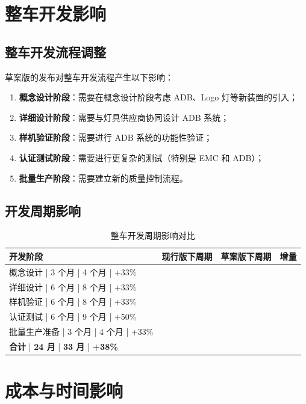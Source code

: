 \section{整车开发影响}

\subsection{整车开发流程调整}

草案版的发布对整车开发流程产生以下影响：

\begin{enumerate}[leftmargin=2em]
    \item \textbf{概念设计阶段}：需要在概念设计阶段考虑 ADB、Logo 灯等新装置的引入；
    \item \textbf{详细设计阶段}：需要与灯具供应商协同设计 ADB 系统；
    \item \textbf{样机验证阶段}：需要进行 ADB 系统的功能性验证；
    \item \textbf{认证测试阶段}：需要进行更复杂的测试（特别是 EMC 和 ADB）；
    \item \textbf{批量生产阶段}：需要建立新的质量控制流程。
\end{enumerate}

\subsection{开发周期影响}

\begin{table}[H]
\centering
\caption{整车开发周期影响对比}
\begin{tabular}{|l|c|c|c|}
\hline
\textbf{开发阶段} & \textbf{现行版下周期} & \textbf{草案版下周期} & \textbf{增量} \\
\hline
概念设计       | 3 个月       | 4 个月       | +33\% \\
\hline
详细设计       | 6 个月       | 8 个月       | +33\% \\
\hline
样机验证       | 6 个月       | 8 个月       | +33\% \\
\hline
认证测试       | 6 个月       | 9 个月       | +50\% \\
\hline
批量生产准备    | 3 个月       | 4 个月       | +33\% \\
\hline
\textbf{合计}    | \textbf{24 月} | \textbf{33 月} | \textbf{+38\%} \\
\hline
\end{tabular}
\end{table}

\section{成本与时间影响}

